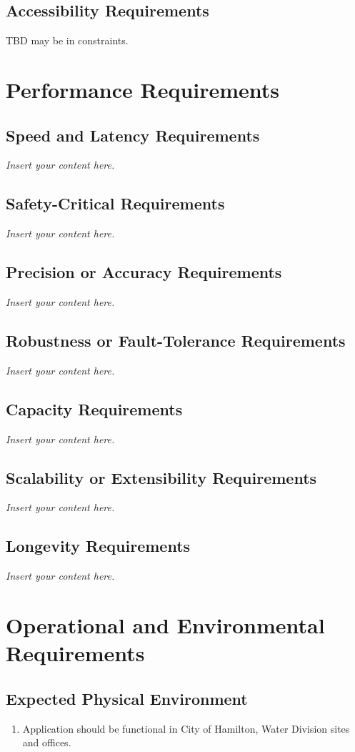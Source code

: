 \documentclass[12pt]{article}
\newcommand{\lips}{\textit{Insert your content here.}}
\begin{document}
\subsection{Accessibility Requirements}
TBD may be in constraints.
\section{Performance Requirements}
\subsection{Speed and Latency Requirements}
\lips
\subsection{Safety-Critical Requirements}
\lips
\subsection{Precision or Accuracy Requirements}
\lips
\subsection{Robustness or Fault-Tolerance Requirements}
\lips
\subsection{Capacity Requirements}
\lips
\subsection{Scalability or Extensibility Requirements}
\lips
\subsection{Longevity Requirements}
\lips

\section{Operational and Environmental Requirements}
\subsection{Expected Physical Environment}
\begin{enumerate} [{OE-PE}1.]
  \item Application should be functional in City of Hamilton, Water
    Division sites and offices.
\end{enumerate}
\end{document}

